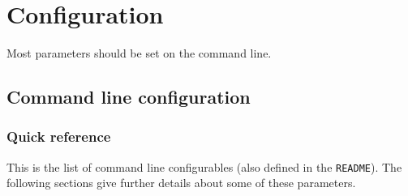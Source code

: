 \documentclass[aps,superscriptaddress,nofootinbib]{revtex4}
\begin{document}
\section{Configuration}

Most parameters should be set on the command line.

\subsection{Command line configuration}

\subsubsection{Quick reference}

This is the list of command line configurables (also defined in the \verb|README|).  The following sections give further details about some of these parameters.
\end{document}
